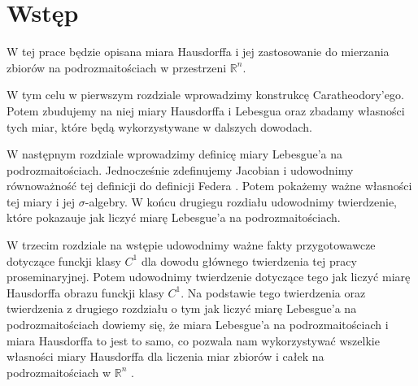 \chapter*{Wstęp}


W tej prace będzie opisana miara Hausdorffa i jej zastosowanie do mierzania zbiorów na podrozmaitościach w przestrzeni $\mathbb{R}^n$.

W tym celu w pierwszym rozdziale wprowadzimy konstrukcę Caratheodory'ego. Potem zbudujemy na niej miary Hausdorffa i Lebesgua oraz zbadamy własności tych miar, które będą wykorzystywane w dalszych dowodach.

W następnym rozdziale wprowadzimy definicę miary Lebesgue'a na podrozmaitościach. Jednocześnie zdefinujemy Jacobian i udowodnimy równoważność tej definicji do definicji Federa \citep{Federer}. Potem pokażemy ważne własności tej miary i jej $\sigma$-algebry. W końcu drugiegu rozdiału udowodnimy twierdzenie, które pokazauje jak liczyć miarę Lebesgue'a na podrozmaitościach.

W trzecim rozdziale na wstępie udowodnimy ważne fakty przygotowawcze dotyczące funckji klasy $C^1$ 
dla dowodu głównego twierdzenia tej pracy proseminaryjnej. Potem udowodnimy twierdzenie dotyczące 
tego jak liczyć miarę Hausdorffa obrazu funckji klasy $C^1$. Na podstawie tego twierdzenia oraz 
twierdzenia z drugiego rozdziału o tym jak liczyć miarę Lebesgue'a na podrozmaitościach dowiemy się, 
że miara Lebesgue'a na podrozmaitościach i miara Hausdorffa to jest to samo, co pozwala nam wykorzystywać 
wszelkie własności miary Hausdorffa dla liczenia miar zbiorów i całek na podrozmaitościach w $\mathbb{R}^n$ .
